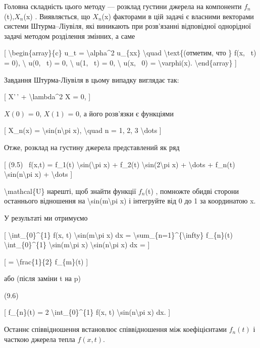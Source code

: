 \documentclass[
]{article}
\begin{document}
Головна складність цього методу --- розклад густини джерела на
компоненти \(f_n\)(t),\(X_n\)(x) . Виявляється, що \(X_n\)(x) факторами
в цій задачі є власними векторами системи Штурма--Ліувіля, які виникають
при розв'язанні відповідної однорідної задачі методом розділення
змінних, а саме

{[} \textbackslash begin\{array\}\{c\} u\_t = \textbackslash alpha\^{}2
u\_\{xx\} \textbackslash quad \textbackslash text\{(отметим, что \} f(x,
~t) = 0), \textbackslash{} u(0, ~t) = 0, \textbackslash{} u(1, ~t) = 0,
\textbackslash{} u(x, ~0) = \textbackslash varphi(x).
\textbackslash end\{array\} {]}

Завдання Штурма-Ліувіля в цьому випадку виглядає так:

{[} X'\,' + \textbackslash lambda\^{}2 X = 0, {]}

\(X(0)\) = 0, \(X(1)\) = 0, а його розв'язки є функціями

{[} X\_n(x) = \textbackslash sin(n\textbackslash pi x),
\textbackslash quad n = 1, 2, 3 \textbackslash dots {]}

Отже, розклад на густину джерела представлений як ряд

{[} (9.5) ~f(x,t) = f\_1(t) \textbackslash sin(\textbackslash pi x) +
f\_2(t) \textbackslash sin(2\textbackslash pi x) + \textbackslash dots +
f\_n(t) \textbackslash sin(n\textbackslash pi x) + \textbackslash dots
{]}

\textbackslash mathcal\{U\} нарешті, щоб знайти функції \(f_n\)(t) ,
помножте обидві сторони останнього відношення на
\textbackslash sin(m\textbackslash pi x) і інтегруйте від 0 до 1 за
координатою x.

У результаті ми отримуємо

{[} \textbackslash int\_\{0\}\^{}\{1\} f(x, t)
\textbackslash sin(m\textbackslash pi x) dx =
\textbackslash sum\_\{n=1\}\^{}\{\textbackslash infty\} f\_\{n\}(t)
\textbackslash int\_\{0\}\^{}\{1\} \textbackslash sin(m\textbackslash pi
x) \textbackslash sin(n\textbackslash pi x) dx = {]}

{[} = \textbackslash frac\{1\}\{2\} f\_\{m\}(t) {]}

або (після заміни t на p)

(9.6)

{[} f\_\{n\}(t) = 2 \textbackslash int\_\{0\}\^{}\{1\} f(x, t)
\textbackslash sin(n\textbackslash pi x) dx. {]}

Останнє співвідношення встановлює співвідношення між коефіцієнтами
\(f_n(t)\) і часткою джерела тепла \(f(x, t)\).
\end{document}
